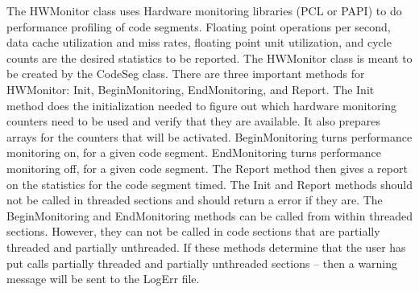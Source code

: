 %


The HWMonitor class uses Hardware monitoring libraries (PCL or PAPI)
to do performance profiling of code segments. Floating point operations
per second, data cache utilization and miss rates, floating point unit
utilization, and cycle counts are the desired statistics to be reported.
The HWMonitor class is meant to be created by the CodeSeg
class. There are three important methods for HWMonitor: Init, BeginMonitoring,
EndMonitoring, and Report. The Init method does the initialization needed
to figure out which hardware monitoring counters need to be used and verify
that they are available. It also prepares arrays for the counters that
will be activated. BeginMonitoring turns performance monitoring on, for
a given code segment. EndMonitoring turns performance monitoring off, for
a given code segment. The Report method then gives a report on the statistics
for the code segment timed. The Init and Report methods should not be
called in threaded sections and should return a error if they are. The BeginMonitoring
and EndMonitoring methods can be called from within threaded sections. However,
they can not be called in code sections that are partially threaded and
partially unthreaded. If these methods determine that the user has put calls
partially threaded and partially unthreaded sections -- then a warning message
will be sent to the LogErr file.


